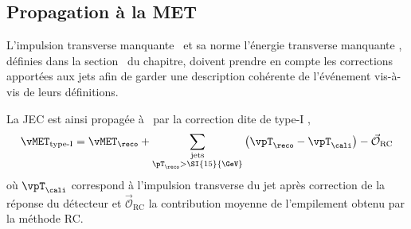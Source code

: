 \subsection{Propagation à la MET}\label{chapter-JERC-section-CMS-subsec-MET}
L'impulsion transverse manquante \vMET\ et sa norme l'énergie transverse manquante \MET,
définies dans la section~ du chapitre,
doivent prendre en compte les corrections apportées aux jets afin de garder une description cohérente de l'événement vis-à-vis de leurs définitions.
\par La JEC est ainsi propagée à \vMET\ par la correction dite de \og type-I \fg,
\begin{equation}
\vMET_\text{type-I} = \vMET_\reco + \sum_{\substack{\text{jets}\\\pT_\reco>\SI{15}{\GeV}}} \left(\vpT_\reco - \vpT_\cali\right) - \vec{\mathcal{O}}_\text{RC}
\end{equation}
où $\vpT_\cali$ correspond à l'impulsion transverse du jet après correction de la réponse du détecteur
et
$\vec{\mathcal{O}}_\text{RC}$ la contribution moyenne de l'empilement obtenu par la méthode RC.
